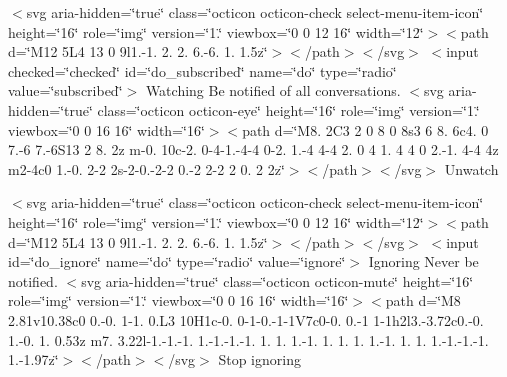 \begin{DoxyItemize}
  $<$svg aria-\/hidden=\char`\"{}true\char`\"{} class=\char`\"{}octicon octicon-\/check select-\/menu-\/item-\/icon\char`\"{} height=\char`\"{}16\char`\"{} role=\char`\"{}img\char`\"{} version=\char`\"{}1.\char`\"{} viewbox=\char`\"{}0 0 12 16\char`\"{} width=\char`\"{}12\char`\"{}$>$$<$path d=\char`\"{}\+M12 5\+L4 13 0 9l1.-\/1. 2. 2. 6.-\/6. 1. 1.\+5z\char`\"{}$>$$<$/path$>$$<$/svg$>$  $<$input checked=\char`\"{}checked\char`\"{} id=\char`\"{}do\+\_\+subscribed\char`\"{} name=\char`\"{}do\char`\"{} type=\char`\"{}radio\char`\"{} value=\char`\"{}subscribed\char`\"{}$>$ Watching Be notified of all conversations.  $<$svg aria-\/hidden=\char`\"{}true\char`\"{} class=\char`\"{}octicon octicon-\/eye\char`\"{} height=\char`\"{}16\char`\"{} role=\char`\"{}img\char`\"{} version=\char`\"{}1.\char`\"{} viewbox=\char`\"{}0 0 16 16\char`\"{} width=\char`\"{}16\char`\"{}$>$$<$path d=\char`\"{}\+M8. 2\+C3 2 0 8 0 8s3 6 8. 6c4. 0 7.-\/6 7.-\/6\+S13 2 8. 2z m-\/0. 10c-\/2. 0-\/4-\/1.-\/4-\/4 0-\/2. 1.-\/4 4-\/4 2. 0 4 1. 4 4 0 2.-\/1. 4-\/4 4z m2-\/4c0 1.-\/0. 2-\/2 2s-\/2-\/0.-\/2-\/2 0.-\/2 2-\/2 2 0. 2 2z\char`\"{}$>$$<$/path$>$$<$/svg$>$ Unwatch   

  $<$svg aria-\/hidden=\char`\"{}true\char`\"{} class=\char`\"{}octicon octicon-\/check select-\/menu-\/item-\/icon\char`\"{} height=\char`\"{}16\char`\"{} role=\char`\"{}img\char`\"{} version=\char`\"{}1.\char`\"{} viewbox=\char`\"{}0 0 12 16\char`\"{} width=\char`\"{}12\char`\"{}$>$$<$path d=\char`\"{}\+M12 5\+L4 13 0 9l1.-\/1. 2. 2. 6.-\/6. 1. 1.\+5z\char`\"{}$>$$<$/path$>$$<$/svg$>$  $<$input id=\char`\"{}do\+\_\+ignore\char`\"{} name=\char`\"{}do\char`\"{} type=\char`\"{}radio\char`\"{} value=\char`\"{}ignore\char`\"{}$>$ Ignoring Never be notified.  $<$svg aria-\/hidden=\char`\"{}true\char`\"{} class=\char`\"{}octicon octicon-\/mute\char`\"{} height=\char`\"{}16\char`\"{} role=\char`\"{}img\char`\"{} version=\char`\"{}1.\char`\"{} viewbox=\char`\"{}0 0 16 16\char`\"{} width=\char`\"{}16\char`\"{}$>$$<$path d=\char`\"{}\+M8 2.\+81v10.\+38c0 0.-\/0. 1-\/1. 0.\+L3 10\+H1c-\/0. 0-\/1-\/0.-\/1-\/1\+V7c0-\/0. 0.-\/1 1-\/1h2l3.-\/3.\+72c0.-\/0. 1.-\/0. 1. 0.\+53z m7. 3.\+22l-\/1.-\/1.-\/1. 1.-\/1.-\/1.-\/1. 1. 1. 1.-\/1. 1. 1. 1. 1.-\/1. 1. 1. 1.-\/1.-\/1.-\/1. 1.-\/1.\+97z\char`\"{}$>$$<$/path$>$$<$/svg$>$ Stop ignoring   


\end{DoxyItemize}
